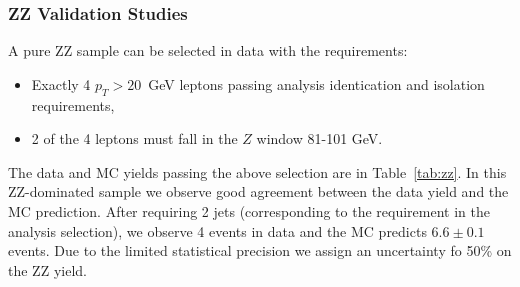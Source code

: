 \clearpage

\subsubsection{ZZ Validation Studies}
\label{sec:bkg_zz}

A pure ZZ sample can be selected in data with the requirements:

\begin{itemize}
\item Exactly 4 $p_T>20$~GeV leptons passing analysis identication and isolation requirements,
\item 2 of the 4 leptons must fall in the $Z$ window 81-101 GeV.
\end{itemize}

The data and MC yields passing the above selection are in Table~\ref{tab:zz}. 
In this ZZ-dominated sample we observe good agreement between the data yield and the MC prediction.
After requiring 2 jets (corresponding to the requirement in the analysis selection), we observe 4 events
in data and the MC predicts $6.6\pm0.1$ events. Due to the limited statistical precision we assign an uncertainty
fo 50\% on the ZZ yield.

